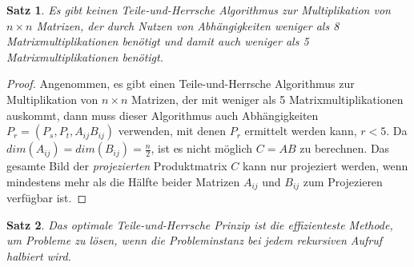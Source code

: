 \documentclass{scrartcl}
\newtheorem{satz}{Satz}[section]
\begin{document}
\begin{satz}
	Es gibt keinen Teile-und-Herrsche Algorithmus zur Multiplikation von $n \times n$ Matrizen, der durch Nutzen von Abhängigkeiten weniger als 8 Matrixmultiplikationen benötigt und damit auch weniger als 5 Matrixmultiplikationen benötigt. 
\end{satz}
\begin{proof}
	Angenommen, es gibt einen Teile-und-Herrsche Algorithmus zur Multiplikation von $n \times n$ Matrizen, der mit weniger als 5 Matrixmultiplikationen auskommt, dann muss dieser Algorithmus auch Abhängigkeiten $P_r = (P_s, P_t, A_{ij}B_{ij})$ verwenden, mit denen $P_r$ ermittelt werden kann, $r < 5$. Da $dim(A_{ij}) = dim(B_{ij}) = \frac{n}{2}$, ist es nicht möglich $C = AB$ zu berechnen. Das gesamte Bild der \textit{projezierten} Produktmatrix $C$ kann nur projeziert werden, wenn mindestens mehr als die Hälfte beider Matrizen $A_{ij}$ und $B_{ij}$ zum Projezieren verfügbar ist.
\end{proof}
\begin{satz}
	Das optimale Teile-und-Herrsche Prinzip ist die effizienteste Methode, um Probleme zu lösen, wenn die Probleminstanz bei jedem rekursiven Aufruf halbiert wird. 
\end{satz}
\end{document}
